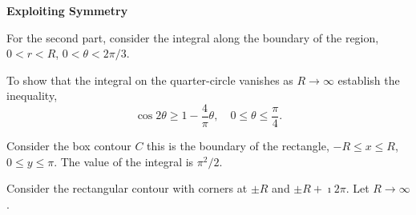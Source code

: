 {%
\begin{large}
  \noindent
  \textbf{Exploiting Symmetry}
\end{large}






\begin{Hint}
  \label{hint e ax / (e x - e -x)}
\end{Hint}





\begin{Hint}
  \label{hint 1/(x^3+1)}
  For the second part, consider the integral along the boundary of the
  region, $0 < r < R$, $0 < \theta < 2 \pi / 3$.
\end{Hint}





\begin{Hint}
  \label{hint 1/(1+x^6)}
\end{Hint}




\begin{Hint}
  \label{hint cos x^2}
  To show that the integral on the quarter-circle vanishes as $R \to \infty$
  establish the inequality,
  \[
  \cos 2 \theta \geq 1 - \frac{4}{\pi} \theta, 
  \quad 0 \leq \theta \leq \frac{\pi}{4}.
  \]
\end{Hint}



\begin{Hint}
  \label{hint x/sinh x}
  Consider the box contour $C$ this is the boundary of the rectangle,
  $-R \leq x \leq R$, $0 \leq y \leq \pi$.  The value of the integral is
  $\pi^2 / 2$.
\end{Hint}



\begin{Hint}
  \label{hint e ax / (e x + 1)}
  Consider the rectangular contour with corners at $\pm R$ and $\pm R + \imath 2 \pi$.
  Let $R \to \infty$.
\end{Hint}








}
